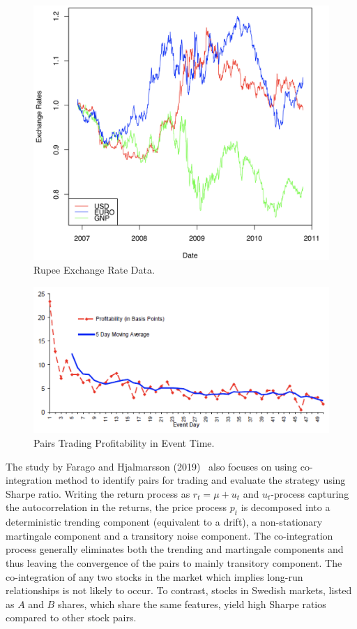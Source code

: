 	\begin{figure}[!ht]
	\centering
	\includegraphics[width=\textwidth]{chapters/chapter_stat_ts/figures/473.png}
	\caption{Rupee Exchange Rate Data. \label{fig:rupee}}
	\end{figure}

	\begin{figure}[!ht]
	\centering
	\includegraphics[width=\textwidth]{chapters/chapter_stat_ts/figures/Sec4-7Fig4.png}
	\caption{Pairs Trading Profitability in Event Time. \label{fig:pairsprofit}}
	\end{figure}

The study by Farago and Hjalmarsson (2019)~\cite{hjal} also focuses on using co-integration method to identify pairs for trading and evaluate the strategy using Sharpe ratio. Writing the return process as $r_t= \mu + u_t$ and $u_t$-process capturing the autocorrelation in the returns, the price process $p_t$ is decomposed into a deterministic trending component (equivalent to a drift), a non-stationary martingale component and a transitory noise component. The co-integration process generally eliminates both the trending and martingale components and thus leaving the convergence of the pairs to mainly transitory component. The co-integration of any two stocks in the market which implies long-run relationships is not likely to occur. To contrast, stocks in Swedish markets, listed as $A$ and $B$ shares, which share the same features, yield high Sharpe ratios compared to other stock pairs. 


